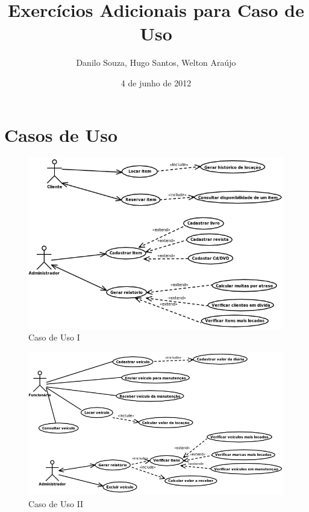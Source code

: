 \documentclass[a4paper,26pt]{article}
\title{Exerc\'icios Adicionais para Caso de Uso}
\author{Danilo Souza, Hugo Santos, Welton Araújo}
\date{4 de junho de 2012}
\begin{document}
\maketitle
\section{Casos de Uso}
\begin{figure}[ht]
  \centering
  \includegraphics[width=14.5cm]{./CasoDeUso1.png}
  \caption{Caso de Uso I}
  \label{fig:quadcorephota}
\end{figure}

\begin{figure}[ht]
  \centering
  \includegraphics[width=14.5cm]{./CasoDeUso2.png}
  \caption{Caso de Uso II}
  \label{fig:quadcorephota}
\end{figure}
\end{document}
